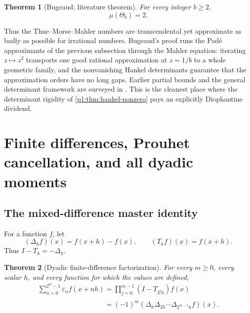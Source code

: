 \documentclass[11pt,oneside]{article}
\numberwithin{equation}{section}
\newtheorem{theorem}{Theorem}[section]
\theoremstyle{definition}
\theoremstyle{remark}
\newcommand{\eps}{\varepsilon}
\begin{document}
\begin{theorem}[Bugeaud; literature theorem]
\label{p1:thm:irrationality-exponent}
For every integer \(b\ge2\),
\begin{equation}
  \boxed{\mu(\Theta_b)=2.}
  \label{p1:eq:irrationality-exponent}
\end{equation}
\end{theorem}

Thus the Thue--Morse--Mahler numbers are transcendental yet approximate as
badly as possible for irrational numbers.  Bugeaud's proof
\cite{p1:bugeaud2011} runs the Pad\'e approximants of the previous subsection
through the Mahler equation: iterating \(z\mapsto z^2\) transports one good
rational approximation at \(z=1/b\) to a whole geometric family, and the
nonvanishing Hankel determinants guarantee that the approximation orders
have no long gaps.  Earlier partial bounds and the general determinant
framework are surveyed in
\cite{p1:bugeaudQueffelec2013,p1:bugeaudHanWenYao2015}.  This is the cleanest
place where the determinant rigidity of \cref{p1:thm:hankel-nonzero} pays an
explicitly Diophantine dividend.

\section[Finite differences and moments]{Finite differences, Prouhet cancellation, and all dyadic moments}
\label{p1:sec:finite-differences}

\subsection{The mixed-difference master identity}

For a function \(f\), let
\begin{equation}
  (\Delta_hf)(x)=f(x+h)-f(x),
  \qquad
  (T_hf)(x)=f(x+h).
  \label{p1:eq:difference-shift}
\end{equation}
Thus \(I-T_h=-\Delta_h\).

\begin{theorem}[Dyadic finite-difference factorization]
\label{p1:thm:finite-difference-master}
For every \(m\ge0\), every scalar \(h\), and every function for which the
values are defined,
\begin{align}
  \boxed{
  \sum_{n=0}^{2^m-1}\eps_nf(x+nh)
  =\prod_{j=0}^{m-1}(I-T_{2^jh})f(x)}
  \label{p1:eq:operator-product}\\
  \boxed{
  \phantom{\sum_{n=0}^{2^m-1}\eps_nf(x+nh)}
  =(-1)^m
    (\Delta_h\Delta_{2h}\cdots\Delta_{2^{m-1}h}f)(x).}
  \label{p1:eq:mixed-difference}
\end{align}
\end{theorem}
\end{document}

